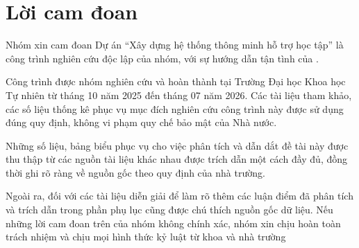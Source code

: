 \chapter*{Lời cam đoan}
\label{reassurances}

Nhóm xin cam đoan Dự án “Xây dựng hệ thống thông minh hỗ trợ học tập” là công trình nghiên cứu độc lập của nhóm, với sự hướng dẫn tận tình của \tenGVHD.

Công trình được nhóm nghiên cứu và hoàn thành tại Trường Đại học Khoa học Tự
nhiên từ tháng 10 năm 2025 đến tháng 07 năm 2026.
Các tài liệu tham khảo, các số liệu thống kê phục vụ mục đích nghiên cứu công
trình này được sử dụng đúng quy định, không vi phạm quy chế bảo mật của Nhà nước.

Những số liệu, bảng biểu phục vụ cho việc phân tích và dẫn dắt đề tài này được thu
thập từ các nguồn tài liệu khác nhau được trích dẫn một cách đầy đủ, đồng thời ghi rõ
ràng về nguồn gốc theo quy định của nhà trường.

Ngoài ra, đối với các tài liệu diễn giải để làm rõ thêm các luận điểm đã phân tích
và trích dẫn trong phần phụ lục cũng được chú thích nguồn gốc dữ liệu.
Nếu những lời cam đoan trên của nhóm không chính xác, nhóm xin chịu hoàn toàn
trách nhiệm và chịu mọi hình thức kỷ luật từ khoa và nhà trường
